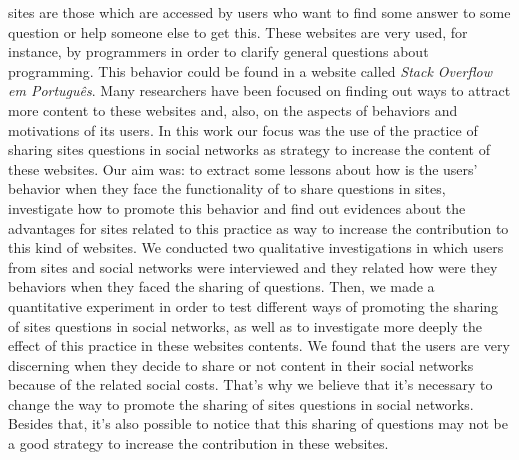 \qa sites are those which are accessed by users who want to find some answer to some question or help someone else to get this. These websites are very used, for instance, by programmers in order to clarify general questions about programming. This behavior could be found in a website called \textit{Stack Overflow em Português}. Many researchers have been focused on finding out ways to attract more content to these websites and, also, on the aspects of behaviors and motivations of its users. In this work our focus was the use of the practice of sharing \qa sites questions in social networks as strategy to increase the content of these websites. Our aim was: to extract some lessons about how is the users' behavior when they face the functionality of to share questions in \qa sites, investigate how to promote this behavior and find out evidences about the advantages for \qa sites related to this practice as way to increase the contribution to this kind of websites. We conducted two qualitative investigations in which users from \qa sites and social networks were interviewed and they related how were they behaviors when they faced the sharing of questions. Then, we made a quantitative experiment in order to test different ways of promoting the sharing of \qa sites questions in social networks, as well as to investigate more deeply the effect of this practice in these websites contents. We found that the users are very discerning when they decide to share or not content in their social networks because of the related social costs. That's why we believe that it's necessary to change the way to promote the sharing of \qa sites questions in social networks. Besides that, it's also possible to notice that this sharing of questions may not be a good strategy to increase the contribution in these websites.  